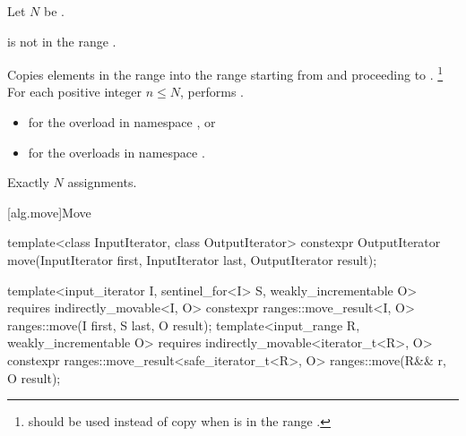 \begin{itemdescr}
\pnum
Let $N$ be .

\pnum
\expects
{} is not in the range .

\pnum
\effects
Copies elements in the range 
into the range 
starting from  and proceeding to .%
\footnote{ should be used instead of copy
when  is in the range .}
For each positive integer $n \le N$,
performs .

\pnum
\returns
\begin{itemize}
\item
  for the overload in namespace , or
\item
  for the overloads in namespace .
\end{itemize}

\pnum
\complexity
Exactly $N$ assignments.
\end{itemdescr}

[alg.move]{Move}

%
\begin{itemdecl}
template<class InputIterator, class OutputIterator>
  constexpr OutputIterator move(InputIterator first, InputIterator last,
                                OutputIterator result);

template<input_iterator I, sentinel_for<I> S, weakly_incrementable O>
  requires indirectly_movable<I, O>
  constexpr ranges::move_result<I, O>
    ranges::move(I first, S last, O result);
template<input_range R, weakly_incrementable O>
  requires indirectly_movable<iterator_t<R>, O>
  constexpr ranges::move_result<safe_iterator_t<R>, O>
    ranges::move(R&& r, O result);
\end{itemdecl}

